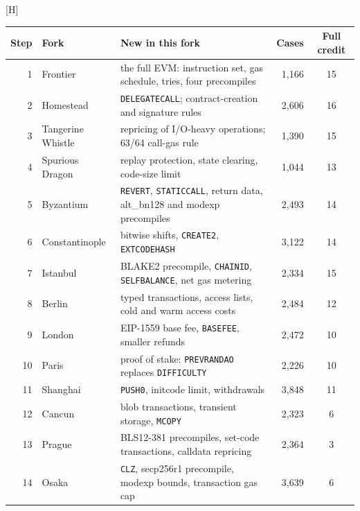 \documentclass{article}
\makeatletter
\renewenvironment{table}
  {\setlength{\abovecaptionskip}{\@abovecaptionskip}%
   \setlength{\belowcaptionskip}{\@belowcaptionskip}%
   \@float{table}}
  {\end@float}
\makeatother
\begin{document}
\begin{table}[H]
  \centering
  \footnotesize
  \setlength{\tabcolsep}{4pt}
  \begin{tabularx}{\linewidth}{@{}r l >{\raggedright\arraybackslash}X r c@{}}
    \toprule
    Step & Fork & New in this fork & Cases & Full credit \\
    \midrule
    1 & Frontier & the full EVM: instruction set, gas schedule, tries, four precompiles & 1,166 & 15 \\
    2 & Homestead & \texttt{DELEGATECALL}; contract-creation and signature rules & 2,606 & 16 \\
    3 & Tangerine Whistle & repricing of I/O-heavy operations; 63/64 call-gas rule & 1,390 & 15 \\
    4 & Spurious Dragon & replay protection, state clearing, code-size limit & 1,044 & 13 \\
    5 & Byzantium & \texttt{REVERT}, \texttt{STATICCALL}, return data, alt\_bn128 and modexp precompiles & 2,493 & 14 \\
    6 & Constantinople & bitwise shifts, \texttt{CREATE2}, \texttt{EXTCODEHASH} & 3,122 & 14 \\
    7 & Istanbul & BLAKE2 precompile, \texttt{CHAINID}, \texttt{SELFBALANCE}, net gas metering & 2,334 & 15 \\
    8 & Berlin & typed transactions, access lists, cold and warm access costs & 2,484 & 12 \\
    9 & London & EIP-1559 base fee, \texttt{BASEFEE}, smaller refunds & 2,472 & 10 \\
    10 & Paris & proof of stake: \texttt{PREVRANDAO} replaces \texttt{DIFFICULTY} & 2,226 & 10 \\
    11 & Shanghai & \texttt{PUSH0}, initcode limit, withdrawals & 3,848 & 11 \\
    12 & Cancun & blob transactions, transient storage, \texttt{MCOPY} & 2,323 & 6 \\
    13 & Prague & BLS12-381 precompiles, set-code transactions, calldata repricing & 2,364 & 3 \\
    14 & Osaka & \texttt{CLZ}, secp256r1 precompile, modexp bounds, transaction gas cap & 3,639 & 6 \\
    \bottomrule
  \end{tabularx}
  \caption{The 14 steps of the Ethereum EVM task. Cases is the number of
    verifier cases for the new fork. Full credit is the number of the 36
    rollouts that receive full credit on the step.}
  \label{tab:evm}
\end{table}
\end{document}
